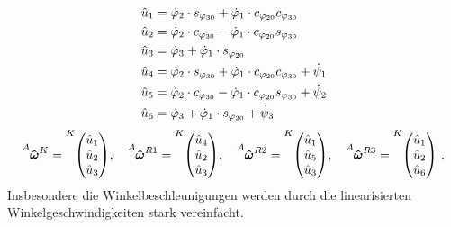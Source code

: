 \begin{align}
\hat{u}_{\text{1}} &= \dot{\varphi}_{\text{2}}\cdot s_{\varphi_{\text{30}}} + \dot{\varphi}_{\text{1}}\cdot c_{\varphi_{\text{20}}}c_{\varphi_{\text{30}}} \\
\hat{u}_{\text{2}} &= \dot{\varphi}_{\text{2}}\cdot c_{\varphi_{\text{30}}} - \dot{\varphi}_{\text{1}}\cdot c_{\varphi_{\text{20}}} s_{\varphi_{\text{30}}} \\
\hat{u}_{\text{3}} &= \dot{\varphi}_{\text{3}} + \dot{\varphi}_{\text{1}}\cdot s_{\varphi_{\text{20}}} \\
\hat{u}_{\text{4}} &= \dot{\varphi}_{\text{2}}\cdot s_{\varphi_{\text{30}}} + \dot{\varphi}_{\text{1}}\cdot c_{\varphi_{\text{20}}} c_{\varphi_{\text{30}}} + \dot{\psi}_{\text{1}} \\
\hat{u}_{\text{5}} &= \dot{\varphi}_{\text{2}}\cdot c_{\varphi_{\text{30}}} - \dot{\varphi}_{\text{1}}\cdot c_{\varphi_{\text{20}}}s_{\varphi_{\text{30}}} + \dot{\psi}_{\text{2}} \\
\hat{u}_{\text{6}} &= \dot{\varphi}_{\text{3}} + \dot{\varphi}_{\text{1}}\cdot s_{\varphi_{\text{20}}} + \dot{\psi}_{\text{3}}
\end{align}
\begin{equation}
\vel{A}{\hat{\omega}}{K} = \vecBS{K}{\hat{u}\idx1}{\hat{u}\idx2}{\hat{u}\idx3}, \hspace{10pt} \vel{A}{\hat{\omega}}{R1} = \vecBS{K}{\hat{u}\idx4}{\hat{u}\idx2}{\hat{u}\idx3}, \hspace{10pt}
\vel{A}{\hat{\omega}}{R2} = \vecBS{K}{\hat{u}\idx1}{\hat{u}\idx5}{\hat{u}\idx3}, \hspace{10pt}
\vel{A}{\hat{\omega}}{R3} = \vecBS{K}{\hat{u}\idx1}{\hat{u}\idx2}{\hat{u}\idx6} \,.
\end{equation}
Insbesondere die Winkelbeschleunigungen werden durch die linearisierten Winkelgeschwindigkeiten stark vereinfacht.
